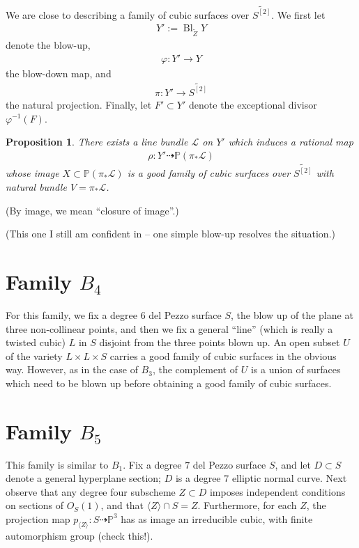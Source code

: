 \documentclass[12 pt]{amsart}
\newtheorem{proposition}{Proposition}[section]
\renewcommand{\P}{\mathbb{P}}
\newcommand{\<}{\left\langle}
\renewcommand{\>}{\right\rangle}
\DeclareMathOperator{\Bl}{Bl}
\begin{document}
We are close to describing a family of cubic surfaces over
$\widetilde{S^{[2]}}$.  We first let
\begin{align}
  \label{eq:XB3}
  Y' := \Bl_{\widetilde{Z}}Y
\end{align}
denote the blow-up,
\begin{align}
  \label{eq:phiB3}
  \varphi: Y' \to Y
\end{align}
the blow-down map, and
\begin{align}
  \label{eq:piB3}
  \pi: Y' \to \widetilde{S^{[2]}}
\end{align}
the natural projection. Finally, let $F' \subset Y'$ denote the
exceptional divisor $\varphi^{-1}(F)$.
\begin{proposition}
  \label{proposition:resolv-b3}
  There exists a line bundle $\mathcal{L}$ on $Y'$ which induces a
  rational map
  \begin{align*}
    \rho: Y' \dashrightarrow \P(\pi_{*}\mathcal{L})
  \end{align*}
  whose image $X \subset \P(\pi_{*}\mathcal{L})$ is a good family of
  cubic surfaces over $\widetilde{S^{[2]}}$ with natural bundle
  $V = \pi_{*} \mathcal{L}$.
\end{proposition}

(By image, we mean ``closure of image''.)

(This one I still am confident in -- one simple blow-up resolves the situation.)

\section{Family $B_4$}
\label{sec:family-b_4}

For this family, we fix a degree $6$ del Pezzo surface $S$, the blow
up of the plane at three non-collinear points, and then we fix a
general ``line'' (which is really a twisted cubic) $L$ in $S$ disjoint
from the three points blown up.  An open subset $U$ of the variety
$L \times L \times S$ carries a good family of cubic surfaces in the
obvious way. However, as in the case of $B_3$, the complement of $U$
is a union of surfaces which need to be blown up before obtaining a
good family of cubic surfaces.


\section{Family $B_5$}
\label{sec:family-b_5-1}

This family is similar to $B_1$. Fix a degree $7$ del Pezzo surface
$S$, and let $D \subset S$ denote a general hyperplane section; $D$ is
a degree $7$ elliptic normal curve.  Next observe that any degree four
subscheme $Z \subset D$ imposes independent conditions on sections of
$O_{S}(1)$, and that $\langle Z \rangle \cap S = Z$.  Furthermore, for
each $Z$, the projection map
$p_{\langle Z \rangle}: S \dashrightarrow \P^{3}$ has as image an
irreducible cubic, with finite automorphism group (check this!).
\end{document}
